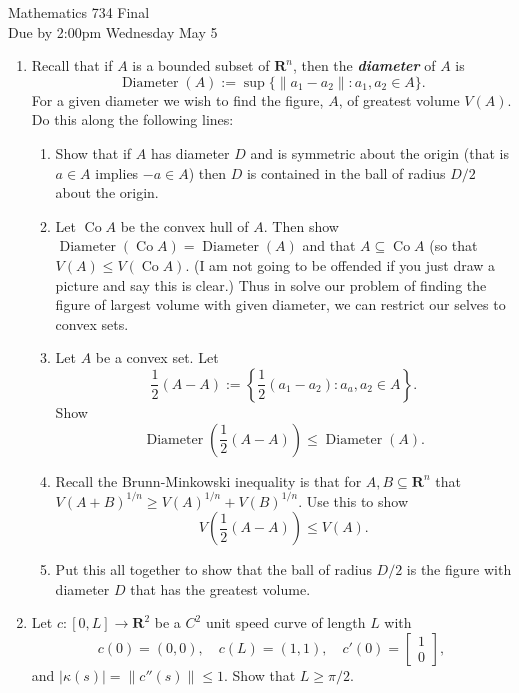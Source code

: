 \documentclass[11pt]{amsart}
\date{\today}
\title[]{}
\newcommand{\bi}[1]{{\bf\itshape #1\/}}  %
\renewcommand{\(}{\left(}
\renewcommand{\)}{\right)}
\renewcommand{\[}{\left[}
\renewcommand{\]}{\right]}
\theoremstyle{definition}
\theoremstyle{remark}
\newcommand{\R}{{\mathbf R}}   %
\newcommand{\cn}{\colon}
\newcommand{\diam}{\operatorname{Diameter}}
\newcommand{\co}{\operatorname{Co}}
\begin{document}
 
% 


\begin{center}\Large
Mathematics 734 Final\\	
Due by 2:00pm  Wednesday May 5
\end{center}

\begin{enumerate}
\item Recall that if $A$ is a bounded subset of $\R^n$, then the \bi{diameter} of $A$ 
is
$$\diam(A):=\sup\{\|a_1-a_2\|: a_1,a_2 \in A\}.$$
For a given diameter we wish to find the figure, $A$, of greatest volume $V(A)$.
  Do this along 
the following lines:
     \begin{enumerate}
	\item Show that if $A$ has diameter $D$ and is symmetric about the origin
	(that is $a\in A$ implies $-a\in A$) then $D$ is contained in the ball of radius 
	$D/2$ about the origin.
	\item Let $\co A$ be the convex hull of $A$.  Then show  $\diam(\co A)=\diam(A)$
	and that $A\subseteq \co A$ (so that $V(A)\leq V(\co A)$.  (I am not going to 
	be offended if you just draw a picture and say this is clear.)  Thus in solve our 
	problem of finding the figure of largest volume with given diameter, we can 
	restrict our selves to convex sets.
	\item Let $A$ be a convex set.  Let
	$$
	\frac12(A-A):=\left\{ \frac12(a_1-a_2):  a_a,a_2\in A\right\}.
	$$
	Show 
	$$
	\diam\(\frac12(A-A)\)\le \diam(A).
	$$
	\item Recall the Brunn-Minkowski inequality is that for $A,B\subseteq \R^n$ 
	that $V(A+B)^{1/n}\ge V(A)^{1/n}+V(B)^{1/n}$.  Use this to show 
	$$
	V\(\frac12(A-A)\)\le V(A).
	$$
	\item Put this all together to 
	 show that the ball of radius $D/2$ is the figure with diameter $D$
	that has the greatest volume.
   \end{enumerate}

\item Let $c\cn [0,L]\to \R^2$ be a $C^2$ unit speed curve of length $L$  with 
$$
c(0)=(0,0),\quad c(L)=(1,1),\quad c'(0)=\[\begin{matrix}1\\0\end{matrix}\],
$$	
and $|\kappa(s)|=\|c''(s)\|\le 1$.  Show that $L\ge \pi/2$.


\end{enumerate}
\end{document}
